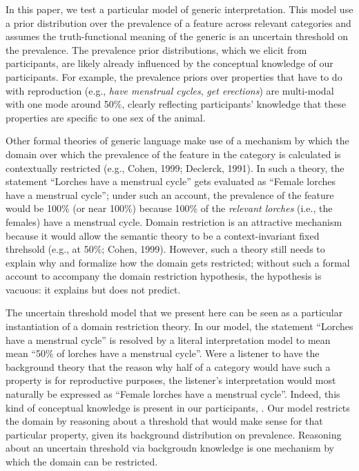 \documentclass[floatsintext,man]{apa6}
\theoremstyle{definition}
\theoremstyle{definition}
\theoremstyle{definition}
\theoremstyle{remark}
\begin{document}
In this paper, we test a particular model of generic interpretation.
This model use a prior distribution over the prevalence of a feature
across relevant categories and assumes the truth-functional meaning of
the generic is an uncertain threshold on the prevalence. The prevalence
prior distributions, which we elicit from participants, are likely
already influenced by the conceptual knowledge of our participants. For
example, the prevalence priors over properties that have to do with
reproduction (e.g., \emph{have menstrual cycles}, \emph{get erections})
are multi-modal with one mode around 50\%, clearly reflecting
participants' knowledge that these properties are specific to one sex of
the animal.

Other formal theories of generic language make use of a mechanism by
which the domain over which the prevalence of the feature in the
category is calculated is contextually restricted (e.g., Cohen, 1999;
Declerck, 1991). In such a theory, the statement \enquote{Lorches have a
menstrual cycle} gets evaluated as \enquote{Female lorches have a
menstrual cycle}; under such an account, the prevalence of the feature
would be 100\% (or near 100\%) because 100\% of the \emph{relevant
lorches} (i.e., the females) have a menstrual cycle. Domain restriction
is an attractive mechanism because it would allow the semantic theory to
be a context-invariant fixed threhsold (e.g., at 50\%; Cohen, 1999).
However, such a theory still needs to explain why and formalize how the
domain gets restricted; without such a formal account to accompany the
domain restriction hypothesis, the hypothesis is vacuous: it explains
but does not predict.

The uncertain threshold model that we present here can be seen as a
particular instantiation of a domain restriction theory. In our model,
the statement \enquote{Lorches have a menstrual cycle} is resolved by a
literal interpretation model to mean mean \enquote{50\% of lorches have
a menstrual cycle}. Were a listener to have the background theory that
the reason why half of a category would have such a property is for
reproductive purposes, the listener's interpretation would most
naturally be expressed as \enquote{Female lorches have a menstrual
cycle}. Indeed, this kind of conceptual knowledge is present in our
participants, . Our model
restricts the domain by reasoning about a threshold that would make
sense for that particular property, given its background distribution on
prevalence. Reasoning about an uncertain threshold via backgroudn
knowledge is one mechanism by which the domain can be restricted.
\end{document}
